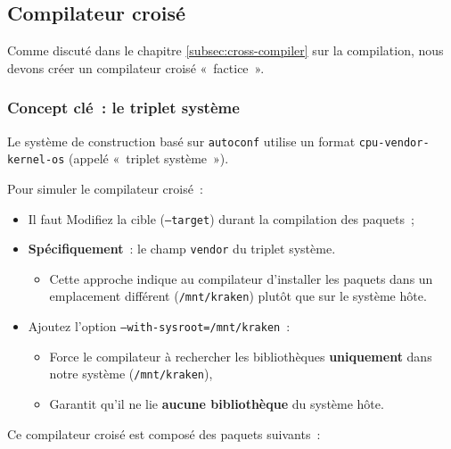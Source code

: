 \subsection{Compilateur croisé}
Comme discuté dans le chapitre  \ref{subsec:cross-compiler} sur la compilation, nous devons créer un compilateur croisé «~factice~».  




\subsubsection{Concept clé~: le triplet système}  
Le système de construction basé sur \texttt{autoconf} utilise un format \texttt{cpu-vendor-kernel-os} (appelé «~triplet système~»).


Pour simuler le compilateur croisé~:  
\begin{itemize}  
  \item Il faut Modifiez la cible (\texttt{--target}) durant la compilation des paquets~;  
  \item \textbf{Spécifiquement}~: le champ \texttt{vendor}  du triplet système.  
  \begin{itemize}  
    \item Cette approche indique au compilateur d’installer les paquets dans un emplacement différent (\texttt{/mnt/kraken}) plutôt que sur le système hôte.  
  \end{itemize}  
  \item Ajoutez l’option \texttt{--with-sysroot=/mnt/kraken}~:  
  \begin{itemize}  
    \item Force le compilateur à rechercher les bibliothèques \textbf{uniquement} dans notre système (\texttt{/mnt/kraken}),  
    \item Garantit qu’il ne lie \textbf{aucune bibliothèque} du système hôte.  
  \end{itemize}  
\end{itemize}  


Ce compilateur croisé est composé des paquets suivants~:

